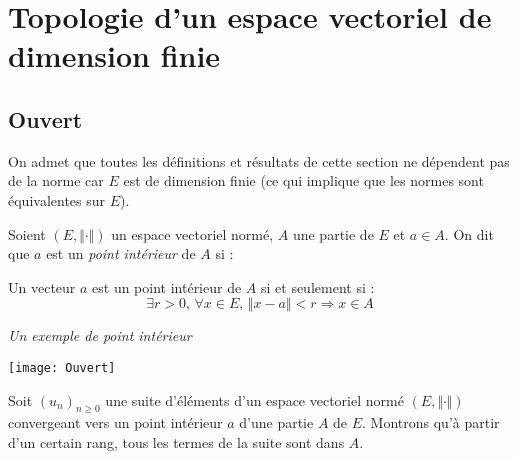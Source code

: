 \documentclass[a4paper,10pt]{report}
\begin{document}
\section{Topologie d'un espace vectoriel de dimension finie}

\subsection{Ouvert}

\begin{Theoreme}{} On admet que toutes les définitions et résultats de cette section ne dépendent pas de la norme car $E$ est de dimension finie (ce qui implique que les normes sont équivalentes sur $E$).
\end{Theoreme}

\begin{Definition}{} Soient $(E, \Vert \cdot \Vert)$ un espace vectoriel normé, $A$ une partie de $E$ et $a \in A$. On dit que $a$ est un \emph{point intérieur} de $A$ si :

\vspace{1cm}
\end{Definition}

\begin{Remarque}{} Un vecteur $a$ est un point intérieur de $A$ si et seulement si :
$$ \exists r>0, \, \forall x \in E, \, \Vert x-a \Vert < r \Rightarrow x \in A$$
\end{Remarque}

\begin{center}
\emph{Un exemple de point intérieur}

\texttt{[image: Ouvert]}
\end{center}

\begin{Exemple} Soit $(u_n)_{n \geq 0}$ une suite d'éléments d'un espace vectoriel normé $(E, \Vert \cdot \Vert)$ convergeant vers un point intérieur $a$ d'une partie $A$ de $E$. Montrons qu'à partir d'un certain rang, tous les termes de la suite sont dans $A$.


\vspace{3cm}
%
\end{Exemple}
\end{document}

